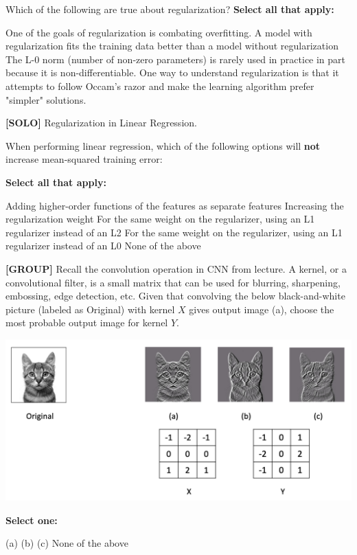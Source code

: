\documentclass[11pt,addpoints,answers]{exam}
\newcommand{\solo}{\textbf{[SOLO]} }
\newcommand{\group}{\textbf{[GROUP]} }
\begin{document}
\begin{questions}
Which of the following are true about regularization?
    \textbf{Select all that apply:}
    {%
    \checkboxchar{$\Box$} \checkedchar{$\blacksquare$}
    \begin{checkboxes}
        \choice One of the goals of regularization is combating overfitting.  
        \choice A model with regularization fits the training data better than a model without regularization 
        \choice The L-0 norm (number of non-zero parameters) is rarely used in practice in part because it is non-differentiable. 
        \choice One way to understand regularization is that it attempts to follow Occam's razor and make the learning algorithm prefer "simpler" solutions.
    \end{checkboxes}
    }
    
    
\question[6] \solo Regularization in Linear Regression. 

When performing linear regression, which of the following options will \textbf{not} increase mean-squared training error:
    
    \textbf{Select all that apply:}
        {%
    \checkboxchar{$\Box$} \checkedchar{$\blacksquare$}
        \begin{checkboxes}
        \choice Adding higher-order functions of the features as separate features
        \choice Increasing the regularization weight
        \choice For the same weight on the regularizer, using an L1 regularizer instead of an L2
        \choice For the same weight on the regularizer, using an L1 regularizer instead of an L0
        \choice None of the above
        \end{checkboxes}
        }

    
    \question[3] \group Recall the convolution operation in CNN from lecture. A kernel, or a convolutional filter, is a small matrix that can be used for blurring, sharpening, embossing, edge detection, etc. Given that convolving the below black-and-white picture (labeled as Original) with kernel $X$ gives output image (a), choose the most probable output image for kernel $Y$.
    \begin{center}
        \includegraphics[scale=0.35]{figs/kernel.png}
    \end{center}
    \textbf{Select one:}
    \begin{checkboxes}
        \choice (a)
        \choice (b)
        \choice (c)
        \choice None of the above
    \end{checkboxes}
    
    
\end{questions}
\end{document}
